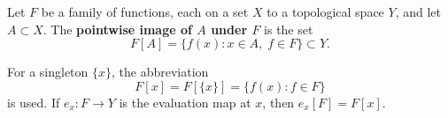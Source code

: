 Let $F$ be a family of functions, each on a set $X$ to a topological space $Y$, and let $A \subset X$. The \textbf{pointwise image of $A$ under $F$} is the set
$$F[A] = \{f(x) : x \in A,\; f \in F\} \subset Y.$$

For a singleton $\{x\}$, the abbreviation
$$F[x] = F[\{x\}] = \{f(x) : f \in F\}$$
is used. If $e_x : F \to Y$ is the evaluation map at $x$, then $e_x[F] = F[x]$.
